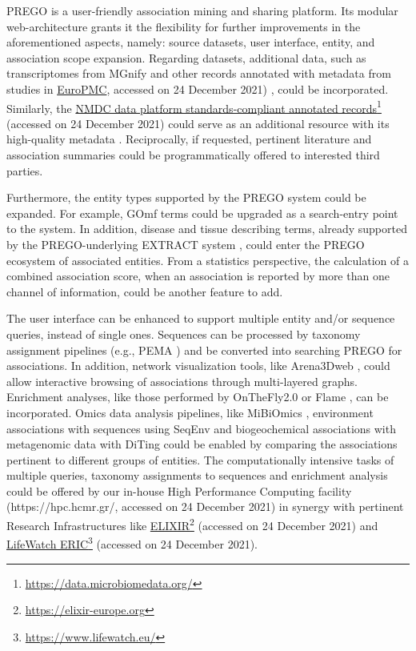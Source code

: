 {   PREGO is a user-friendly association mining and sharing platform. 
   Its modular web-architecture grants it the flexibility for further improvements in the aforementioned aspects, namely: 
   source datasets, user interface, entity, and association scope expansion. Regarding datasets, additional data, such as transcriptomes from MGnify and other records annotated with metadata from studies in \href{https://ebi-metagenomics.github.io/blog/2021/11/17/Publication-Annotations/}{EuroPMC}, accessed on 24 December 2021) \citep{ferguson2021europe}, could be incorporated. 
   Similarly, the \href{https://data.microbiomedata.org/}{NMDC data platform standards-compliant annotated records}\footnote{\href{https://data.microbiomedata.org/}{https://data.microbiomedata.org/}} (accessed on 24 December 2021) could serve as an additional resource with its high-quality metadata \citep{wood2020national, vangay2021microbiome}. 
   Reciprocally, if requested, pertinent literature and association summaries could be programmatically offered to interested third parties.

   Furthermore, the entity types supported by the PREGO system could be expanded. For example, GOmf terms could be upgraded as a search-entry point to the system. 
   In addition, disease and tissue describing terms, already supported by the PREGO-underlying EXTRACT system \citep{pafilis2016extract}, could enter the PREGO ecosystem of associated entities. 
   From a statistics perspective, the calculation of a combined association score, when an association is reported by more than one channel of information, could be another feature to add.

   The user interface can be enhanced to support multiple entity and/or sequence queries, instead of single ones. 
   Sequences can be processed by taxonomy assignment pipelines (e.g., PEMA \citep{zafeiropoulos2020pema}) and be converted into searching PREGO for associations. 
   In addition, network visualization tools, like Arena3Dweb \citep{karatzas2021arena3dweb}, could allow interactive browsing of associations through multi-layered graphs. 
   Enrichment analyses, like those performed by OnTheFly2.0 \citep{baltoumas2021onthefly2} or Flame \citep{thanati2021flame}, 
   can be incorporated. 
   Omics data analysis pipelines, like MiBiOmics \citep{zoppi2021mibiomics}, environment associations with sequences using SeqEnv \citep{sinclair2016seqenv} and biogeochemical associations with metagenomic data with DiTing \citep{xue2021diting} could be enabled by comparing the associations pertinent to different groups of entities. 
   The computationally intensive tasks of multiple queries, taxonomy assignments to sequences and enrichment analysis could be offered by our in-house High Performance Computing facility (https://hpc.hcmr.gr/, accessed on 24 December 2021) \citep{zafeiropoulos20210s} in synergy with pertinent Research Infrastructures like \href{https://elixir-europe.org}{ELIXIR}\footnote{\href{https://elixir-europe.org}{https://elixir-europe.org}} (accessed on 24 December 2021) and \href{https://www.lifewatch.eu/}{LifeWatch ERIC}\footnote{\href{https://www.lifewatch.eu/}{https://www.lifewatch.eu/}} (accessed on 24 December 2021).



}
